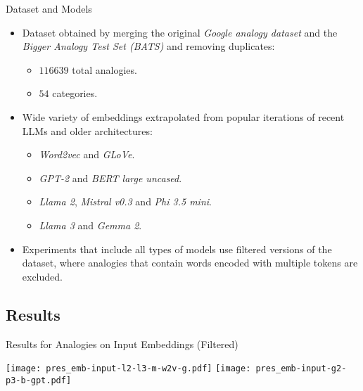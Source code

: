 \documentclass[aspectratio=169, 12pt, compress]{beamer}
\begin{document}
    \begin{frame}{Dataset and Models}
        \begin{itemize}[<+|visible@+->]
            \item<1-1> Dataset obtained by merging the original \emph{Google analogy dataset} and the \emph{Bigger Analogy Test Set (BATS)} and removing duplicates:
            \begin{itemize}
                \item<1-1> $116 639$ total analogies.
                \item<1-1> $54$ categories.
            \end{itemize}
            \item<2-2> Wide variety of embeddings extrapolated from popular iterations of recent LLMs and older architectures:
            \begin{itemize}
                \item<2-2> \emph{Word2vec} and \emph{GLoVe}.
                \item<2-2> \emph{GPT-2} and \emph{BERT large uncased}.
                \item<2-2> \emph{Llama 2}, \emph{Mistral v0.3} and \emph{Phi 3.5 mini}.
                \item<2-2> \emph{Llama 3} and \emph{Gemma 2}.
            \end{itemize}
            \item<3-3> Experiments that include all types of models use filtered versions of the dataset, where analogies that contain words encoded with multiple tokens are excluded.
        \end{itemize}
    \end{frame}

    \subsection{Results}

    \begin{frame}{Results for Analogies on Input Embeddings (Filtered)}
        \vspace*{0.3cm}
        \begin{minipage}{\textwidth}
            \centering
            \texttt{[image: pres\_emb-input-l2-l3-m-w2v-g.pdf]}%
            \texttt{[image: pres\_emb-input-g2-p3-b-gpt.pdf]}%
        \end{minipage}%
    \end{frame}
\end{document}
